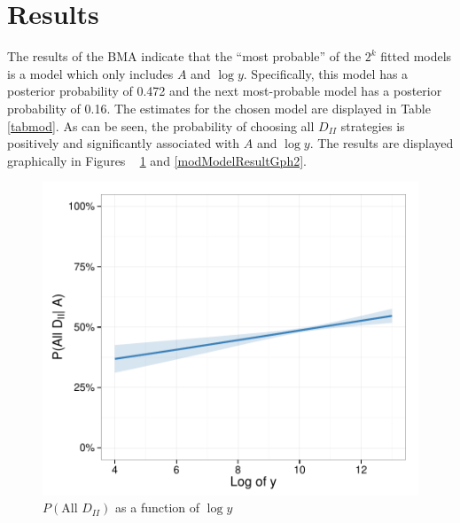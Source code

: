 \documentclass[1p, review]{elsarticle}\usepackage[]{graphicx}\usepackage[]{color}
\makeatletter
\def\maxwidth{ %
  \ifdim\Gin@nat@width>\linewidth
    \linewidth
  \else
    \Gin@nat@width
  \fi
}
\newenvironment{knitrout}{}{} %
\makeatother
\begin{document}
\section{Results}
\label{sec:results}

The results of the BMA indicate that the ``most probable'' of the $2^k$ fitted models is a model which only includes $A$ and $\log{y}$. Specifically, this model has a posterior probability of 0.472 and the next most-probable model has a posterior probability of 0.16. The estimates for the chosen model are displayed in Table ~ \ref{tabmod}. As can be seen, the probability of choosing all $D_{II}$ strategies is positively and significantly associated with $A$ and $\log{y}$. The results are displayed graphically in Figures ~ \ref{modModelResultGph1} and \ref{modModelResultGph2}. 

\begin{table}[ht]
\centering
{}
\caption{Model Results} 
\label{tabmod}
\end{table}


\begin{knitrout}\small
{}\color{fgcolor}\begin{figure}

{\centering \includegraphics[width=\maxwidth]{figure/ModelResultGph1-1} 

}

\caption[]{$P(\text{All } D_{II})$ as a function of $\log{y}$}\label{modModelResultGph1}
\end{figure}


\end{knitrout}
\end{document}
